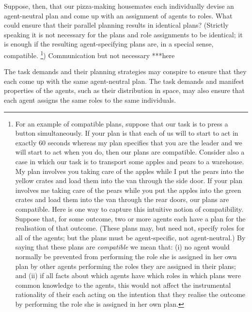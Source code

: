 \documentclass[12pt,\papersize]{extarticle}
\begin{document}
Suppose, then, that our pizza-making housemates each individually devise an agent-neutral plan and come up with an assignment of agents to roles.  
What could ensure that their parallel planning results in identical plans?
(Strictly speaking it is not necessary for the plans and role assignments to be identical; it is enough if the resulting agent-specifying plans are, in a special sense, compatible.%
\footnote{
For an example of compatible plans, suppose that our task is to press a button simultaneously. 
If your plan is that each of us will to start to act in exactly 60 seconds whereas my plan specifies that you are the leader and we will start to act when you do, then our plans are compatible.
Consider also a case in which our task is to transport some apples and pears to a warehouse. 
My plan involves you taking care of the apples while I put the pears into the yellow crates and load them into the van through the side door.
If your plan involves me taking care of the pears while you put the apples into the green crates and load them into the van through the rear doors, our plans are compatible.
Here is one way to capture this intuitive notion of compatibility.
\label{fn:df_compatible}
Suppose that, for some outcome, two or more agents each have a plan for the realisation of that outcome. 
(These plans may, but need not, specify roles for all of the agents; but the plans must be agent-specific, not agent-neutral.)
By saying that these plans are \emph{compatible} we mean that:
(i) 
no agent would normally be prevented from performing the role she is assigned in her own plan by other agents performing the roles they are assigned in their plans;
and
(ii)
if all facts about which agents have which roles in which plans were common knowledge to the agents,
this would not affect the instrumental rationality of their each acting on the intention that they realise the outcome by performing the role she is assigned in her own plan.
})
Communication but not necessary ***here
	
		The task demands and their planning strategies may conspire to ensure that they each come up with the same agent-neutral plan.
	The task demands and manifest properties of the agents, such as their distribution in space, may also ensure that each agent  assigns the same roles to the same individuals.
\end{document}
